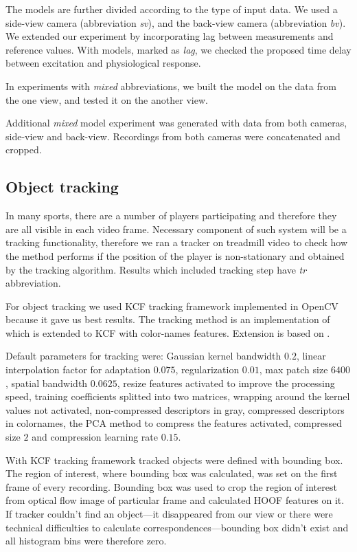 The models are further divided according to the type of input data. We used a side-view camera (abbreviation \textit{sv}), and the back-view camera (abbreviation \textit{bv}). We extended our experiment by incorporating lag between measurements and reference values. With models, marked as \textit{lag}, we checked the proposed time delay between excitation and physiological response.

In experiments with \textit{mixed} abbreviations, we built the model on the data from the one view, and tested it on the another view.

Additional \textit{mixed} model experiment was generated with data from both cameras, side-view and back-view. Recordings from both cameras were concatenated and cropped. 

\subsection{Object tracking}\label{sec:tracking}
In many sports, there are a number of players participating and therefore they are all visible in each video frame. Necessary component of such system will be a tracking functionality, therefore we ran a tracker on treadmill video to check how the method performs if the position of the player is non-stationary and obtained by the tracking algorithm. Results which included tracking step have \textit{tr} abbreviation. 

For object tracking we used KCF tracking framework implemented in OpenCV because it gave us best results. The tracking method is an implementation of \cite{henriques2012exploiting} which is extended to KCF with color-names features. Extension is based on \cite{danelljan2014adaptive}.

Default parameters for tracking were: Gaussian kernel bandwidth $0.2$, linear interpolation factor for adaptation $0.075$, regularization $0.01$, max patch size $6400$, spatial bandwidth $0.0625$, resize features activated to improve the processing speed, training coefficients splitted into two matrices, wrapping around the kernel values not activated, non-compressed descriptors in gray, compressed descriptors in colornames, the PCA method to compress the features activated, compressed size $2$ and compression learning rate $0.15$.

With KCF tracking framework tracked objects were defined with bounding box. The region of interest, where bounding box was calculated, was set on the first frame of every recording. Bounding box was used to crop the region of interest from optical flow image of particular frame and calculated HOOF features on it. If tracker couldn't find an object---it disappeared from our view or there were technical difficulties to calculate correspondences---bounding box didn't exist and all histogram bins were therefore zero.

